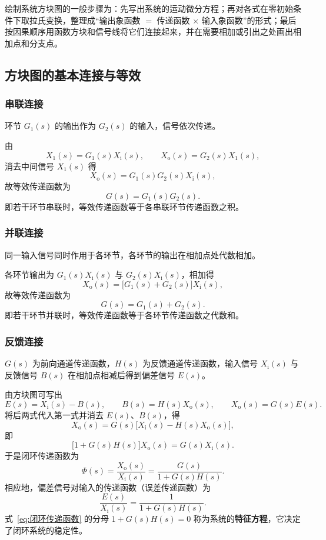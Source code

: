 绘制系统方块图的一般步骤为：先写出系统的运动微分方程；再对各式在零初始条件下取拉氏变换，整理成“输出象函数 $=$ 传递函数 $\times$ 输入象函数”的形式；最后按因果顺序用函数方块和信号线将它们连接起来，并在需要相加或引出之处画出相加点和分支点。

\subsection{方块图的基本连接与等效}

\subsubsection{串联连接}

环节 $G_{1}(s)$ 的输出作为 $G_{2}(s)$ 的输入，信号依次传递。

由
\[
X_{1}(s)=G_{1}(s)X_{\mathrm{i}}(s),\qquad
X_{\mathrm{o}}(s)=G_{2}(s)X_{1}(s),
\]
消去中间信号 $X_{1}(s)$ 得
\[
X_{\mathrm{o}}(s)=G_{1}(s)G_{2}(s)X_{\mathrm{i}}(s),
\]
故等效传递函数为
\begin{equation}
    G(s)=G_{1}(s)G_{2}(s).
    \label{eq:串联等效}
\end{equation}
即若干环节串联时，等效传递函数等于各串联环节传递函数之积。

\subsubsection{并联连接}

同一输入信号同时作用于各环节，各环节的输出在相加点处代数相加。

各环节输出为 $G_{1}(s)X_{\mathrm{i}}(s)$ 与 $G_{2}(s)X_{\mathrm{i}}(s)$，相加得
\[
X_{\mathrm{o}}(s)=\bigl[G_{1}(s)+G_{2}(s)\bigr]X_{\mathrm{i}}(s),
\]
故等效传递函数为
\begin{equation}
    G(s)=G_{1}(s)+G_{2}(s).
    \label{eq:并联等效}
\end{equation}
即若干环节并联时，等效传递函数等于各环节传递函数之代数和。

\subsubsection{反馈连接}

$G(s)$ 为前向通道传递函数，$H(s)$ 为反馈通道传递函数，输入信号 $X_{\mathrm{i}}(s)$ 与反馈信号 $B(s)$ 在相加点相减后得到偏差信号 $E(s)$。

由方块图可写出
\[
E(s)=X_{\mathrm{i}}(s)-B(s),\qquad B(s)=H(s)X_{\mathrm{o}}(s),\qquad X_{\mathrm{o}}(s)=G(s)E(s).
\]
将后两式代入第一式并消去 $E(s)$、$B(s)$，得
\[
X_{\mathrm{o}}(s)=G(s)\bigl[X_{\mathrm{i}}(s)-H(s)X_{\mathrm{o}}(s)\bigr],
\]
即
\[
\bigl[1+G(s)H(s)\bigr]X_{\mathrm{o}}(s)=G(s)X_{\mathrm{i}}(s).
\]
于是闭环传递函数为
\begin{equation}
    \Phi(s)=\frac{X_{\mathrm{o}}(s)}{X_{\mathrm{i}}(s)}
    =\frac{G(s)}{1+G(s)H(s)}.
    \label{eq:闭环传递函数}
\end{equation}
相应地，偏差信号对输入的传递函数（误差传递函数）为
\begin{equation}
    \frac{E(s)}{X_{\mathrm{i}}(s)}=\frac{1}{1+G(s)H(s)}.
\end{equation}
式~\eqref{eq:闭环传递函数} 的分母 $1+G(s)H(s)=0$ 称为系统的\textbf{特征方程}，它决定了闭环系统的稳定性。

